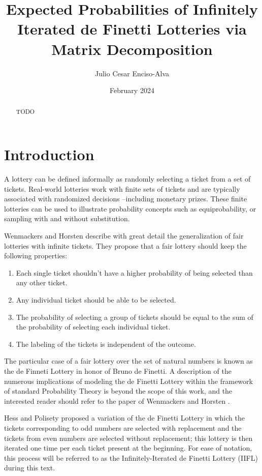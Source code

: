 \documentclass{article}
\title{Expected Probabilities of Infinitely Iterated de Finetti Lotteries via Matrix Decomposition}
\author{Julio Cesar Enciso-Alva}
\date{February 2024}
\begin{document}
\maketitle

\begin{abstract}
    TODO
\end{abstract}


\section{Introduction}

A lottery can be defined informally as randomly selecting a ticket from a set of tickets. 
%
Real-world lotteries work with finite sets of tickets and are typically associated with randomized decisions --including monetary prizes. 
%
These finite lotteries can be used to illustrate probability concepts such as equiprobability, or sampling with and without substitution.

Wenmackers and Horsten \cite{fair_infinite_lottery} describe with great detail the generalization of fair lotteries with infinite tickets.
%
They propose that a fair lottery should keep the following properties:
\begin{enumerate}
    \item Each single ticket shouldn't have a higher probability of being selected than any other ticket.
    \item Any individual ticket should be able to be selected.
    \item The probability of selecting a group of tickets should be equal to the sum of the probability of selecting each individual ticket.
    \item The labeling of the tickets is independent of the outcome.
\end{enumerate}

The particular case of a fair lottery over the set of natural numbers is known as the de Finneti Lottery in honor of Bruno de Finetti.
%
A description of the numerous implications of modeling the de Finetti Lottery within the framework of standard Probability Theory is beyond the scope of this work, and the interested reader should refer to the paper of Wenmackers and Horsten \cite{fair_infinite_lottery}.


Hess and Polisety \cite{hess2023} proposed a variation of the de Finetti Lottery in which the tickets corresponding to odd numbers are selected with replacement and the tickets from even numbers are selected without replacement;
%
this lottery is then iterated one time per each ticket present at the beginning.
%
For ease of notation, this process will be referred to as the Infinitely-Iterated de Finetti Lottery (IIFL) during this text.
\end{document}
